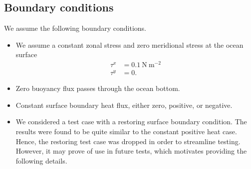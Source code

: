 \subsection{Boundary conditions}

We assume the following boundary conditions.
\begin{itemize}

\item We assume a constant zonal stress and zero meridional stress at
  the ocean surface
\begin{subequations}
\begin{align}
 \tau^{x} &=  0.1~\mbox{N}~\mbox{m}^{-2}
 \\
 \tau^{y} &=  0.
\end{align} 
\end{subequations}

\item Zero buoyancy flux passes through the ocean bottom.

\item Constant surface boundary heat flux, either zero, positive, or
  negative.

\item We considered a test case with a restoring surface boundary
  condition.  The results were found to be quite similar to the
  constant positive heat case.  Hence, the restoring test case was
  dropped in order to streamline testing. However, it may prove of use
  in future tests, which motivates providing the following details.


\end{itemize}
